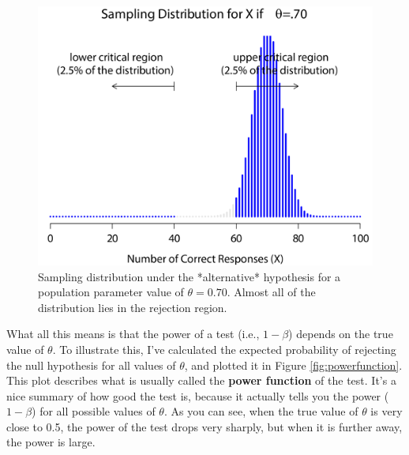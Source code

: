 \documentclass[
]{book}
\begin{document}
\begin{figure}

{\centering \includegraphics[width=1\linewidth]{img/nhst/rejectionRegion4} 

}

\caption{Sampling distribution under the *alternative* hypothesis for a population parameter value of $\theta = 0.70$. Almost all of the distribution lies in the rejection region.}\label{fig:crit4}
\end{figure}

What all this means is that the power of a test (i.e., \(1-\beta\)) depends on the true value of \(\theta\). To illustrate this, I've calculated the expected probability of rejecting the null hypothesis for all values of \(\theta\), and plotted it in Figure \ref{fig:powerfunction}. This plot describes what is usually called the {\textbf{power function}} of the test. It's a nice summary of how good the test is, because it actually tells you the power (\(1-\beta\)) for all possible values of \(\theta\). As you can see, when the true value of \(\theta\) is very close to 0.5, the power of the test drops very sharply, but when it is further away, the power is large.
\end{document}
